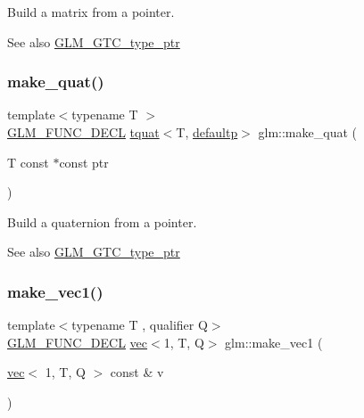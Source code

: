 Build a matrix from a pointer. \begin{DoxySeeAlso}{See also}
\hyperlink{group__gtc__type__ptr}{G\+L\+M\+\_\+\+G\+T\+C\+\_\+type\+\_\+ptr} 
\end{DoxySeeAlso}
\mbox{\label{group__gtc__type__ptr_gaadafb6600af2633e4c98cc64c72f5269}} 
\subsubsection{\texorpdfstring{make\+\_\+quat()}{make\_quat()}}
{\footnotesize\ttfamily template$<$typename T $>$ \\
\hyperlink{setup_8hpp_ab2d052de21a70539923e9bcbf6e83a51}{G\+L\+M\+\_\+\+F\+U\+N\+C\+\_\+\+D\+E\+CL} \hyperlink{structglm_1_1tquat}{tquat}$<$T, \hyperlink{namespaceglm_a36ed105b07c7746804d7fdc7cc90ff25a9d21ccd8b5a009ec7eb7677befc3bf51}{defaultp}$>$ glm\+::make\+\_\+quat (\begin{DoxyParamCaption}\item[{T const $\ast$const}]{ptr }\end{DoxyParamCaption})}

Build a quaternion from a pointer. \begin{DoxySeeAlso}{See also}
\hyperlink{group__gtc__type__ptr}{G\+L\+M\+\_\+\+G\+T\+C\+\_\+type\+\_\+ptr} 
\end{DoxySeeAlso}
\mbox{\label{group__gtc__type__ptr_ga4135f03f3049f0a4eb76545c4967957c}} 
\subsubsection{\texorpdfstring{make\+\_\+vec1()}{make\_vec1()}\hspace{0.1cm}{\footnotesize\ttfamily [1/4]}}
{\footnotesize\ttfamily template$<$typename T , qualifier Q$>$ \\
\hyperlink{setup_8hpp_ab2d052de21a70539923e9bcbf6e83a51}{G\+L\+M\+\_\+\+F\+U\+N\+C\+\_\+\+D\+E\+CL} \hyperlink{structglm_1_1vec}{vec}$<$1, T, Q$>$ glm\+::make\+\_\+vec1 (\begin{DoxyParamCaption}\item[{\hyperlink{structglm_1_1vec}{vec}$<$ 1, T, Q $>$ const \&}]{v }\end{DoxyParamCaption})\hspace{0.3cm}{\ttfamily [inline]}}

